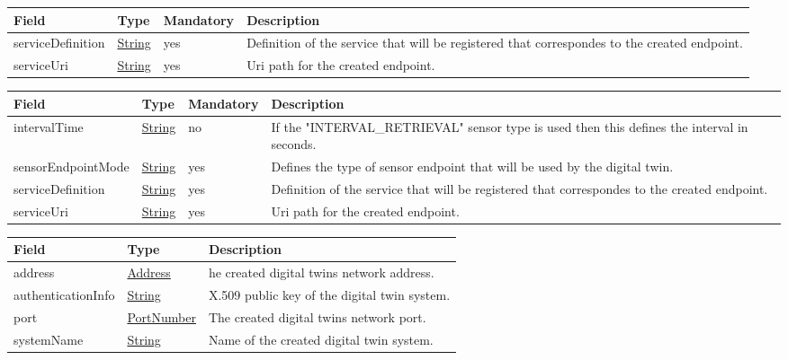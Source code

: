 \documentclass[a4paper]{arrowhead}
\newcommand{\pref}[1]{{\textcolor{ArrowheadGrey}{\hyperref[sec:model:primitives:#1]{#1}}}}
\begin{document}
\label{sec:model:ControlCommand}
 
\begin{table}[H]
\begin{tabularx}{\textwidth}{| p{4.25cm} | p{3.5cm} | p{2cm} | X |} \hline
\rowcolor{gray!33} Field & Type & Mandatory & Description \\ \hline
serviceDefinition & \pref{String} & yes & Definition of the service that will be registered that correspondes to the created endpoint. \\ \hline
serviceUri & \pref{String} & yes & Uri path for the created endpoint.\\ \hline
\end{tabularx}
\end{table}

\label{sec:model:SensedProperty}
 
\begin{table}[H]
\begin{tabularx}{\textwidth}{| p{4.25cm} | p{3.5cm} | p{2cm} | X |} \hline
\rowcolor{gray!33} Field & Type & Mandatory & Description \\ \hline
intervalTime & \pref{String} & no & If the "INTERVAL\_RETRIEVAL" sensor type is used then this defines the interval in seconds. \\ \hline
sensorEndpointMode & \pref{String} & yes & Defines the type of sensor endpoint that will be used by the digital twin.\\ \hline
serviceDefinition & \pref{String} & yes & Definition of the service that will be registered that correspondes to the created endpoint. \\ \hline
serviceUri & \pref{String} & yes & Uri path for the created endpoint.\\ \hline
\end{tabularx}
\end{table}

\label{sec:model:DigitalTwinResponse}
 
\begin{table}[H]
\begin{tabularx}{\textwidth}{| p{4cm} | p{4cm} | X |} \hline
\rowcolor{gray!33} Field & Type & Description \\ \hline
address & \pref{Address} & he created digital twins network address. \\ \hline
authenticationInfo &\pref{String}  & X.509 public key of the digital twin system. \\ \hline
port & \pref{PortNumber} & The created digital twins network port. \\ \hline
systemName & \pref{String} & Name of the created digital twin system.  \\ \hline
\end{tabularx}
\end{table}
\end{document}
